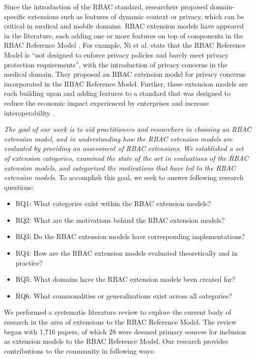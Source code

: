Since the introduction of the RBAC standard, researchers proposed domain-specific extensions such as features of dynamic context or privacy, which
can be critical in medical and mobile domains. RBAC extension models have appeared in the literature, each adding one or more features on top of components in the RBAC Reference Model \cite{kuhn2010adding}.
For example, Ni et al. \cite{ni2010privacy} state that the RBAC Reference Model is ``not designed to enforce privacy policies and barely 
meet privacy protection requirements'', with the introduction of privacy concerns in the medical domain.
They proposed an RBAC extension model for privacy concerns incorporated in the RBAC Reference Model.
Further, these extension models are each building upon and adding features to a standard that was designed to reduce the economic impact experienced by enterprises and increase interoperability \cite{o20102010}.

\textit{The goal of our work is to aid practitioners and researchers in choosing an RBAC extension model, and in understanding
how the RBAC extension models are evaluated by providing an assessment of RBAC extensions. We established a set of extension categories, examined the state of the art in evaluations of the RBAC extension models, and categorized the motivations that have led to the RBAC extension models.
} To accomplish this goal, we seek to answer following research questions:

\begin{itemize}
\setlength{\itemsep}{0.25pt}
\item RQ1: What categories exist within the RBAC extension models?
\item RQ2: What are the motivations behind the RBAC extension models?
\item RQ3: Do the RBAC extension models have corresponding implementations?
\item RQ4: How are the RBAC extension models evaluated theoretically and in practice?
\item RQ5: What domains have the RBAC extension models been created for?
\item RQ6: What commonalities or generalizations exist across all categories?
\end{itemize}

We performed a systematic literature review to explore the current body of research in the area of extensions to the RBAC Reference Model. 
The review began with 1,716 papers, of which 28 were deemed primary sources for inclusion as extension models to the RBAC Reference Model.
Our research provides contributions to the community in following ways:

